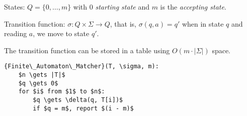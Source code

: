 \begin{mydefinition}
States: $Q = \{0, \ldots, m\}$ with $0$ \emph{starting state} and $m$ is the \emph{accepting state}.

Transition function: $\sigma: Q \times \Sigma \rightarrow Q$, that is, $\sigma(q,a) = q'$ when in state $q$ and reading $a$, we move to state $q'$.
\end{mydefinition}

The transition function can be stored in a table using $O(m \cdot |\Sigma|)$ space.

\begin{lstlisting}[mathescape]
{Finite\_Automaton\_Matcher}(T, \sigma, m):
	$n \gets |T|$
	$q \gets 0$
	for $i$ from $1$ to $n$:
		$q \gets \delta(q, T[i])$
		if $q = m$, report $(i - m)$
\end{lstlisting}